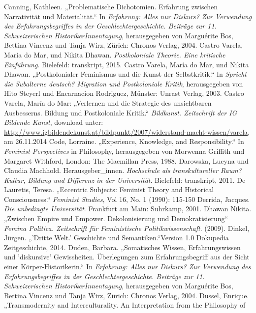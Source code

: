 \begin{thebibliography}{100}
 Canning, Kathleen. „Problematische Dichotomien. Erfahrung zwischen Narrativität und
Materialität.“ In \emph{Erfahrung: Alles nur Diskurs? Zur Verwendung des
  Erfahrungsbegriffes in der Geschlechtergeschichte. Beiträge zur 11.
Schweizerischen HistorikerInnentagung}, herausgegeben von Marguérite Bos, Bettina Vincenz und Tanja Wirz, Zürich: Chronos Verlag, 2004.
 Castro Varela, María do Mar, und Nikita Dhawan. \emph{Postkoloniale Theorie. Eine kritische
Einführung}. Bielefeld: transkript, 2015.
 Castro Varela, María do Mar, und Nikita Dhawan. „Postkolonialer Feminismus und die Kunst der
Selbstkritik.“ In \emph{Spricht die Subalterne deutsch? Migration und
Postkoloniale Kritik},
herausgegeben von Hito Steyerl und Encarnacion Rodriguez, Münster: Unrast Verlag, 2003.
 Castro Varela, María do Mar: „Verlernen und die Strategie des unsichtbaren Ausbesserns. Bildung 
und Postkoloniale Kritik.“ \emph{Bildkunst. Zeitschrift der IG Bildende Kunst},
download unter:
\url{http://www.igbildendekunst.at/bildpunkt/2007/widerstand-macht-wissen/varela}, am 26.11.2014
 Code, Lorraine. „Experience, Knowledge, and Responsibility.“ In
\emph{Feminist Perspectives} in
Philosophy, herausgegeben von Morwenna Griffith und Margaret Withford, London: The Macmillan Press, 1988. 
 Darowska, Lucyna und Claudia Machhold. Herausgeber\_innen.
\emph{Hochschule als transkultureller
Raum? Kultur, Bildung und Differenz in der Universität}. Bielefeld: transkript, 2011. 
 De Lauretis, Teresa. „Eccentric Subjects: Feminist Theory
and Historical Consciousness.“ \emph{Feminist Studies}, Vol 16, No. 1 (1990): 115-150 
 Derrida, Jacques. \emph{Die unbedingte Universität}. Frankfurt am Main: Suhrkamp, 2001.
 Dhawan Nikita. „Zwischen Empire und Empower. Dekolonisierung und Demokratisierung“ 
\emph{Femina Politica. Zeitschrift für Feministische Politikwissenschaft}. (2009).
 Dinkel, Jürgen. „'Dritte Welt.' Geschichte und Semantiken.“Version 1.0 Dokupedia Zeitgeschichte,
     2014. 
 Duden, Barbara. „Somatisches Wissen, Erfahrungswissen und 'diskursive' Gewissheiten.
Überlegungen zum Erfahrungsbegriff aus der Sicht einer Körper-Historikerin.“ In
\emph{Erfahrung: Alles nur Diskurs? Zur Verwendung des Erfahrungsbegriffes in
  der Geschlechtergeschichte. Beiträge zur 11. Schweizerischen
HistorikerInnentagung}, herausgegeben von Marguérite Bos, Bettina Vincenz und Tanja Wirz,  Zürich: Chronos Verlag, 2004.
 Dussel, Enrique. „Transmodernity and Interculturality. An Interpretation from the Philosophy of

\end{thebibliography}
